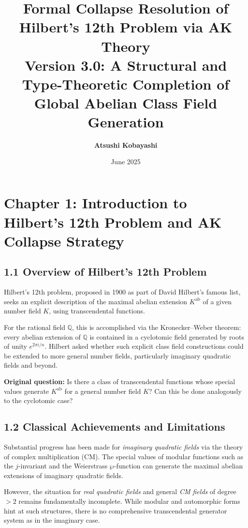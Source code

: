 \documentclass[11pt]{article}
\title{Formal Collapse Resolution of Hilbert's 12th Problem via AK Theory\\
\Large Version 3.0: A Structural and Type-Theoretic Completion of Global Abelian Class Field Generation}
\author{\textbf{Atsushi Kobayashi} \quad {\small (with ChatGPT Research Partner)}}
\date{June 2025}
\begin{document}
\maketitle
\tableofcontents
\newpage


\section{Chapter 1: Introduction to Hilbert's 12th Problem and AK Collapse Strategy}

\subsection{1.1 Overview of Hilbert's 12th Problem}

Hilbert's 12th problem, proposed in 1900 as part of David Hilbert's famous list, seeks an explicit description of the maximal abelian extension \( K^{\mathrm{ab}} \) of a given number field \( K \), using transcendental functions.

For the rational field \( \mathbb{Q} \), this is accomplished via the Kronecker–Weber theorem: every abelian extension of \( \mathbb{Q} \) is contained in a cyclotomic field generated by roots of unity \( e^{2\pi i/n} \).  
Hilbert asked whether such explicit class field constructions could be extended to more general number fields, particularly imaginary quadratic fields and beyond.

\textbf{Original question:}  
Is there a class of transcendental functions whose special values generate \( K^{\mathrm{ab}} \) for a general number field \( K \)?  
Can this be done analogously to the cyclotomic case?

\subsection{1.2 Classical Achievements and Limitations}

Substantial progress has been made for \textit{imaginary quadratic fields} via the theory of complex multiplication (CM).  
The special values of modular functions such as the \( j \)-invariant and the Weierstrass \( \wp \)-function can generate the maximal abelian extensions of imaginary quadratic fields.

However, the situation for \textit{real quadratic fields} and general \textit{CM fields} of degree \( > 2 \) remains fundamentally incomplete.  
While modular and automorphic forms hint at such structures, there is no comprehensive transcendental generator system as in the imaginary case.
\end{document}
